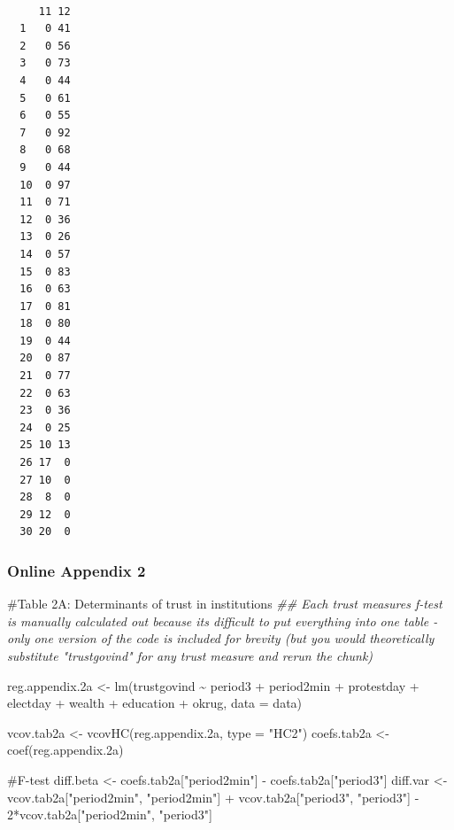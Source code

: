 \documentclass[
  letterpaper,
  DIV=11,
  numbers=noendperiod]{scrartcl}
\newenvironment{Shaded}{\begin{snugshade}}{\end{snugshade}}
\newcommand{\AttributeTok}[1]{\textcolor[rgb]{0.40,0.45,0.13}{#1}}
\newcommand{\CommentTok}[1]{\textcolor[rgb]{0.37,0.37,0.37}{#1}}
\newcommand{\DecValTok}[1]{\textcolor[rgb]{0.68,0.00,0.00}{#1}}
\newcommand{\DocumentationTok}[1]{\textcolor[rgb]{0.37,0.37,0.37}{\textit{#1}}}
\newcommand{\FloatTok}[1]{\textcolor[rgb]{0.68,0.00,0.00}{#1}}
\newcommand{\FunctionTok}[1]{\textcolor[rgb]{0.28,0.35,0.67}{#1}}
\newcommand{\NormalTok}[1]{\textcolor[rgb]{0.00,0.23,0.31}{#1}}
\newcommand{\OtherTok}[1]{\textcolor[rgb]{0.00,0.23,0.31}{#1}}
\newcommand{\SpecialCharTok}[1]{\textcolor[rgb]{0.37,0.37,0.37}{#1}}
\newcommand{\StringTok}[1]{\textcolor[rgb]{0.13,0.47,0.30}{#1}}
\begin{document}
\begin{verbatim}
    
     11 12
  1   0 41
  2   0 56
  3   0 73
  4   0 44
  5   0 61
  6   0 55
  7   0 92
  8   0 68
  9   0 44
  10  0 97
  11  0 71
  12  0 36
  13  0 26
  14  0 57
  15  0 83
  16  0 63
  17  0 81
  18  0 80
  19  0 44
  20  0 87
  21  0 77
  22  0 63
  23  0 36
  24  0 25
  25 10 13
  26 17  0
  27 10  0
  28  8  0
  29 12  0
  30 20  0
\end{verbatim}

\subsubsection{Online Appendix 2}\label{online-appendix-2}

\begin{Shaded}
\begin{Highlighting}[]
\CommentTok{\#Table 2A: Determinants of trust in institutions}
\DocumentationTok{\#\# Each trust measure\textquotesingle{}s f{-}test is manually calculated out because it\textquotesingle{}s difficult to put everything into one table {-} only one version of the code is included for brevity (but you would theoretically substitute "trustgovind" for any trust measure and rerun the chunk)}

\NormalTok{reg.appendix}\FloatTok{.2}\NormalTok{a }\OtherTok{\textless{}{-}} \FunctionTok{lm}\NormalTok{(trustgovind }\SpecialCharTok{\textasciitilde{}}\NormalTok{ period3 }\SpecialCharTok{+}\NormalTok{ period2min }\SpecialCharTok{+}\NormalTok{ protestday }\SpecialCharTok{+}\NormalTok{ electday }\SpecialCharTok{+}
\NormalTok{                        wealth }\SpecialCharTok{+}\NormalTok{ education }\SpecialCharTok{+}\NormalTok{ okrug, }\AttributeTok{data =}\NormalTok{ data)}

\NormalTok{vcov.tab2a }\OtherTok{\textless{}{-}} \FunctionTok{vcovHC}\NormalTok{(reg.appendix}\FloatTok{.2}\NormalTok{a, }\AttributeTok{type =} \StringTok{"HC2"}\NormalTok{)}
\NormalTok{coefs.tab2a }\OtherTok{\textless{}{-}} \FunctionTok{coef}\NormalTok{(reg.appendix}\FloatTok{.2}\NormalTok{a)}

\CommentTok{\#F{-}test}
\NormalTok{diff.beta }\OtherTok{\textless{}{-}}\NormalTok{ coefs.tab2a[}\StringTok{"period2min"}\NormalTok{] }\SpecialCharTok{{-}}\NormalTok{ coefs.tab2a[}\StringTok{"period3"}\NormalTok{]}
\NormalTok{diff.var }\OtherTok{\textless{}{-}}\NormalTok{ vcov.tab2a[}\StringTok{"period2min"}\NormalTok{, }\StringTok{"period2min"}\NormalTok{] }\SpecialCharTok{+} 
\NormalTok{  vcov.tab2a[}\StringTok{"period3"}\NormalTok{, }\StringTok{"period3"}\NormalTok{] }\SpecialCharTok{{-}} \DecValTok{2}\SpecialCharTok{*}\NormalTok{vcov.tab2a[}\StringTok{"period2min"}\NormalTok{, }\StringTok{"period3"}\NormalTok{]}


\end{Highlighting}
\end{Shaded}
\end{document}
